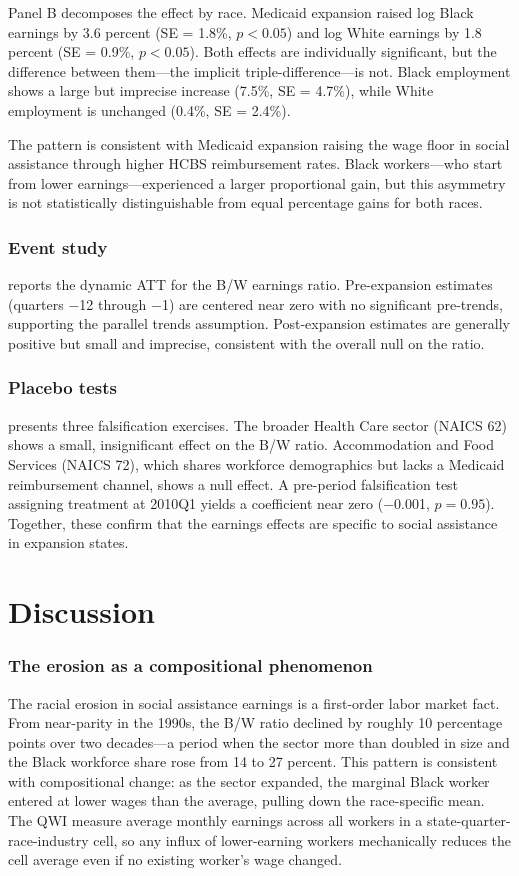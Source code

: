 \documentclass[12pt]{article}
\begin{document}
Panel B decomposes the effect by race. Medicaid expansion raised log Black earnings by 3.6 percent (SE = 1.8\%, $p < 0.05$) and log White earnings by 1.8 percent (SE = 0.9\%, $p < 0.05$). Both effects are individually significant, but the difference between them---the implicit triple-difference---is not. Black employment shows a large but imprecise increase (7.5\%, SE = 4.7\%), while White employment is unchanged (0.4\%, SE = 2.4\%).

The pattern is consistent with Medicaid expansion raising the wage floor in social assistance through higher HCBS reimbursement rates. Black workers---who start from lower earnings---experienced a larger proportional gain, but this asymmetry is not statistically distinguishable from equal percentage gains for both races.

\subsubsection*{Event study}  reports the dynamic ATT for the B/W earnings ratio. Pre-expansion estimates (quarters $-$12 through $-$1) are centered near zero with no significant pre-trends, supporting the parallel trends assumption. Post-expansion estimates are generally positive but small and imprecise, consistent with the overall null on the ratio.

\subsubsection*{Placebo tests}  presents three falsification exercises. The broader Health Care sector (NAICS 62) shows a small, insignificant effect on the B/W ratio. Accommodation and Food Services (NAICS 72), which shares workforce demographics but lacks a Medicaid reimbursement channel, shows a null effect. A pre-period falsification test assigning treatment at 2010Q1 yields a coefficient near zero ($-$0.001, $p = 0.95$). Together, these confirm that the earnings effects are specific to social assistance in expansion states.

\section{Discussion}

\subsubsection*{The erosion as a compositional phenomenon} The racial erosion in social assistance earnings is a first-order labor market fact. From near-parity in the 1990s, the B/W ratio declined by roughly 10 percentage points over two decades---a period when the sector more than doubled in size and the Black workforce share rose from 14 to 27 percent. This pattern is consistent with compositional change: as the sector expanded, the marginal Black worker entered at lower wages than the average, pulling down the race-specific mean. The QWI measure average monthly earnings across all workers in a state-quarter-race-industry cell, so any influx of lower-earning workers mechanically reduces the cell average even if no existing worker's wage changed.
\end{document}
